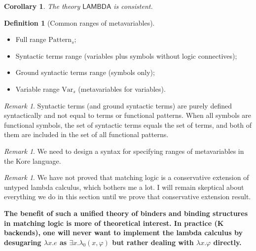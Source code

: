 \documentclass[UTF8]{article}
\newcommand{\comment}[1]
    {\par {\bfseries \color{blue} #1 \par}} %
\newcounter{thmcounter}
\theoremstyle{plain}
\newtheorem{corollary}[thmcounter]{Corollary}
\theoremstyle{definition}
\newtheorem{definition}[thmcounter]{Definition}
\theoremstyle{remark}
\newtheorem{remark}[thmcounter]{Remark}
\newcommand{\LAMBDA}{\mathsf{LAMBDA}}
\begin{document}
\begin{corollary}
	The theory $\LAMBDA$ is consistent.
\end{corollary}


\begin{definition}[Common ranges of metavariables]
\quad
\begin{itemize}
\item Full range $\mathrm{Pattern}_s$;
\item Syntactic terms range (variables plus symbols without logic connectives);
\item Ground syntactic terms range (symbols only); 
\item Variable range $\mathrm{Var}_s$ (metavariables for variables).
\end{itemize}
\end{definition}

\begin{remark}
Syntactic terms (and ground syntactic terms) are purely defined syntactically and not equal to terms or functional patterns. When all symbols are functional symbols, the set of syntactic terms equals the set of terms, and both of them are included in the set of all functional patterns. 
\end{remark}

\begin{remark}
We need to design a syntax for specifying ranges of metavariables in the Kore language. 
\end{remark}

\begin{remark}
We have not proved that matching logic is a conservative extension of untyped lambda calculus, which bothers me a lot. I will remain skeptical about everything we do in this section until we prove that conservative extension result. 
\end{remark}

\comment{The benefit of such a unified theory of binders and binding structures in matching logic is more of theoretical interest. In practice (K backends), one will never want to implement the lambda calculus by desugaring $\lambda x . e$ as $\exists x . \lambda_0(x, \varphi)$ but rather dealing with $\lambda x . \varphi$ directly. }
\end{document}
